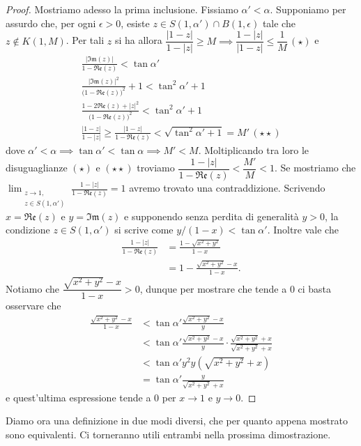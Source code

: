 \begin{proof}
  Mostriamo adesso la prima inclusione. Fissiamo $\alpha'<\alpha$. Supponiamo per assurdo che, per ogni $\epsilon>0$, esiste $z \in S(1,\alpha')\cap B(1,\epsilon)$ tale che $z \not\in K(1,M)$. Per tali $z$ si ha allora $\dfrac{|1-z|}{1-|z|} \ge M \implies \dfrac{1-|z|}{|1-z|} \le \dfrac{1}{M}\, (\star)$ e
  \begin{gather*}
    \frac{|\mathfrak{Im}(z)|}{1-\mathfrak{Re}(z)}<\tan{\alpha'} \\
    \frac{|\mathfrak{Im}(z)|^2}{\bigl(1-\mathfrak{Re}(z)\bigr)^2}+1<\tan^2{\alpha'}+1 \\
    \frac{1-2\mathfrak{Re}(z)+|z|^2}{\bigl(1-\mathfrak{Re}(z)\bigr)^2}<\tan^2{\alpha'}+1 \\
    \frac{|1-z|}{1-|z|}\ge \frac{|1-z|}{1-\mathfrak{Re}(z)}<\sqrt{\tan^2{\alpha'}+1}=M' \, (\star\star)
  \end{gather*}
  dove $\alpha'<\alpha \implies \tan{\alpha'}<\tan{\alpha} \implies M'<M$. Moltiplicando tra loro le disuguaglianze $(\star)$ e $(\star\star)$ troviamo $\dfrac{1-|z|}{1-\mathfrak{Re}(z)}<\dfrac{M'}{M}<1$.
  Se mostriamo che $\displaystyle \lim_{\substack{z \longrightarrow 1, \\ z \in S(1,\alpha')}} \frac{1-|z|}{1-\mathfrak{Re}(z)}=1$ avremo trovato una contraddizione. Scrivendo $x=\mathfrak{Re}(z)$ e $y=\mathfrak{Im}(z)$ e supponendo senza perdita di generalità $y>0$, la condizione $z \in S(1,\alpha')$ si scrive come $y/(1-x)<\tan{\alpha'}$. Inoltre vale che
  \begin{align*}
    \frac{1-|z|}{1-\mathfrak{Re}(z)} &=\frac{1-\sqrt{x^2+y^2}}{1-x} \\
    & =1-\frac{\sqrt{x^2+y^2}-x}{1-x}.
  \end{align*}
  Notiamo che $\dfrac{\sqrt{x^2+y^2}-x}{1-x}>0$, dunque per mostrare che tende a $0$ ci basta osservare che
  \begin{align*}
    \frac{\sqrt{x^2+y^2}-x}{1-x} & < \tan{\alpha'}\frac{\sqrt{x^2+y^2}-x}{y} \\
    & <\tan{\alpha'}\frac{\sqrt{x^2+y^2}-x}{y}\cdot\frac{\sqrt{x^2+y^2}+x}{\sqrt{x^2+y^2}+x} \\
    & <\tan{\alpha'}{y^2}{y(\sqrt{x^2+y^2}+x)} \\
    & =\tan{\alpha'}\frac{y}{\sqrt{x^2+y^2}+x}
  \end{align*}
  e quest'ultima espressione tende a $0$ per $x \longrightarrow 1$ e $y \longrightarrow 0$.
\end{proof}

Diamo ora una definizione in due modi diversi, che per quanto appena mostrato sono equivalenti. Ci torneranno utili entrambi nella prossima dimostrazione.

